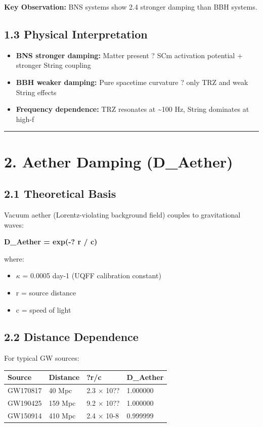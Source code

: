 \documentclass[11pt]{article}
\begin{document}
\textbf{Key Observation:} BNS systems show 2.4 stronger damping than BBH systems.

\subsection*{1.3 Physical Interpretation}

\begin{itemize}
  \item \textbf{BNS stronger damping:} Matter present ? SCm activation potential + stronger String coupling
  \item \textbf{BBH weaker damping:} Pure spacetime curvature ? only TRZ and weak String effects
  \item \textbf{Frequency dependence:} TRZ resonates at \textasciitilde{}100 Hz, String dominates at high-f
\end{itemize}

\noindent\rule{\textwidth}{0.4pt}

\section*{2. Aether Damping (D\_Aether)}

\subsection*{2.1 Theoretical Basis}

Vacuum aether (Lorentz-violating background field) couples to gravitational waves:

\textbf{D\_Aether = exp(-? r / c)}

where:

\begin{itemize}
  \item $\kappa$ = 0.0005 day-1 (UQFF calibration constant)
  \item r = source distance
  \item c = speed of light
\end{itemize}

\subsection*{2.2 Distance Dependence}

For typical GW sources:

\begin{center}
\begin{longtable}{llll}
\toprule
Source & Distance & ?r/c & D\_Aether \tabularnewline
\midrule
\endhead
GW170817 & 40 Mpc & 2.3 $\times$ 10?? & 1.000000 \tabularnewline
GW190425 & 159 Mpc & 9.2 $\times$ 10?? & 1.000000 \tabularnewline
GW150914 & 410 Mpc & 2.4 $\times$ 10-8 & 0.999999 \tabularnewline
\bottomrule
\end{longtable}
\end{center}
\end{document}
